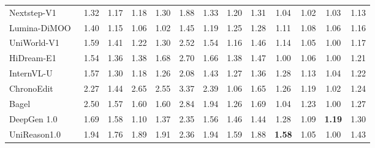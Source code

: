 \begin{table}[t]
{\begin{tabular}{l|cccccc|cccccc}
            Nextstep-V1~\cite{han2025nextstep}
            & 1.32 & 1.17 & 1.18 & 1.30 & 1.88 & \cellcolor[HTML]{C8C8C8}1.33 & 1.20 & 1.31 & 1.04 & 1.02 & 1.03
            & \cellcolor[HTML]{C8C8C8}1.13 \\

            Lumina-DiMOO~\cite{xin2025lumina}
            & 1.40 & 1.15 & 1.06 & 1.02 & 1.45 & \cellcolor[HTML]{C8C8C8}1.19 & 1.25 & 1.28 & 1.11 & 1.08 & 1.06
            & \cellcolor[HTML]{C8C8C8}1.16 \\

            

            UniWorld-V1~\cite{lin2025uniworld}
            & 1.59 & 1.41 & 1.22 & 1.30 & 2.52 & \cellcolor[HTML]{C8C8C8}1.54 & 1.16 & 1.46 & 1.14 & 1.05 & 1.00
            & \cellcolor[HTML]{C8C8C8}1.17  \\

            HiDream-E1~\cite{cai2025hidream}
            & 1.54 & 1.36 & 1.38 & 1.68 & 2.70 &\cellcolor[HTML]{C8C8C8} 1.66  & 1.38 & 1.47 & 1.00 & 1.06 & 1.00
            & \cellcolor[HTML]{C8C8C8}1.21 \\

            InternVL-U~\cite{tian2026internvl}
            & 1.57 & 1.30 & 1.18 & 1.26 & 2.08 & \cellcolor[HTML]{C8C8C8}1.43 & 1.27 & 1.36 & 1.28 & 1.13 & 1.04
            &\cellcolor[HTML]{C8C8C8}1.22 \\

            ChronoEdit~\cite{wu2025chronoedit}
            & 2.27 & 1.44 & 2.65 & 2.55 & 3.37 & \cellcolor[HTML]{C8C8C8}2.39 & 1.06 & 1.65 & 1.26 & 1.19 & 1.02
            & \cellcolor[HTML]{C8C8C8}1.24 \\

            Bagel~\cite{deng2025emerging}
            & 2.50 & 1.57 & 1.60 & 1.60 & 2.84 & \cellcolor[HTML]{C8C8C8}1.94 & 1.26 & 1.69 & 1.04 & 1.23 & 1.00
            & \cellcolor[HTML]{C8C8C8}1.27 \\

            DeepGen 1.0~\cite{wang2026deepgen}
            & 1.69 & 1.58 & 1.10 & 1.37 & 2.35 & \cellcolor[HTML]{C8C8C8}1.56 & 1.46 & 1.44 & 1.28 & 1.09 & \color[HTML]{F88825}\textbf{1.19 }
            & \cellcolor[HTML]{C8C8C8}1.30 \\

            UniReason1.0~\cite{wang2026unireason}
            & 1.94 & 1.76 & 1.89 & 1.91 & 2.36 & \cellcolor[HTML]{C8C8C8}1.94 & 1.59 & 1.88 & \color[HTML]{F88825}\textbf{1.58} & 1.05 & 1.00
            & \cellcolor[HTML]{C8C8C8}1.43 \\


\end{tabular}}
\end{table}
